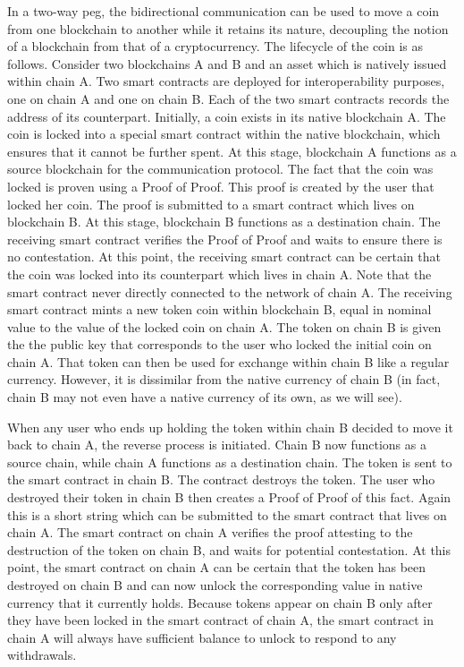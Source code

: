In a two-way peg, the bidirectional communication can be used to move a coin
from one blockchain to another while it retains its nature, decoupling the
notion of a blockchain from that of a cryptocurrency. The lifecycle of the coin
is as follows. Consider two blockchains A and B and an asset which is natively
issued within chain A. Two smart contracts are deployed for interoperability
purposes, one on chain A and one on chain B. Each of the two smart contracts
records the address of its counterpart. Initially, a coin exists in its native
blockchain A. The coin is locked into a special smart contract within the native
blockchain, which ensures that it cannot be further spent. At this stage,
blockchain A functions as a source blockchain for the communication protocol.
The fact that the coin was locked is proven using a Proof of Proof. This proof
is created by the user that locked her coin. The proof is submitted to a smart
contract which lives on blockchain B. At this stage, blockchain B functions as a
destination chain. The receiving smart contract verifies the Proof of Proof and
waits to ensure there is no contestation. At this point, the receiving smart
contract can be certain that the coin was locked into its counterpart which
lives in chain A. Note that the smart contract never directly connected to the
network of chain A. The receiving smart contract mints a new token coin within
blockchain B, equal in nominal value to the value of the locked coin on chain A.
The token on chain B is given the the public key that corresponds to the user
who locked the initial coin on chain A. That token can then be used for exchange
within chain B like a regular currency. However, it is dissimilar from the
native currency of chain B (in fact, chain B may not even have a native currency
of its own, as we will see).

When any user who ends up holding the token within chain B decided to move it
back to chain A, the reverse process is initiated. Chain B now functions as a
source chain, while chain A functions as a destination chain. The token is sent
to the smart contract in chain B. The contract destroys the token. The user who
destroyed their token in chain B then creates a Proof of Proof of this fact.
Again this is a short string which can be submitted to the smart contract that
lives on chain A. The smart contract on chain A verifies the proof attesting to
the destruction of the token on chain B, and waits for potential contestation.
At this point, the smart contract on chain A can be certain that the token has
been destroyed on chain B and can now unlock the corresponding value in native
currency that it currently holds. Because tokens appear on chain B only after
they have been locked in the smart contract of chain A, the smart contract in
chain A will always have sufficient balance to unlock to respond to any
withdrawals.

